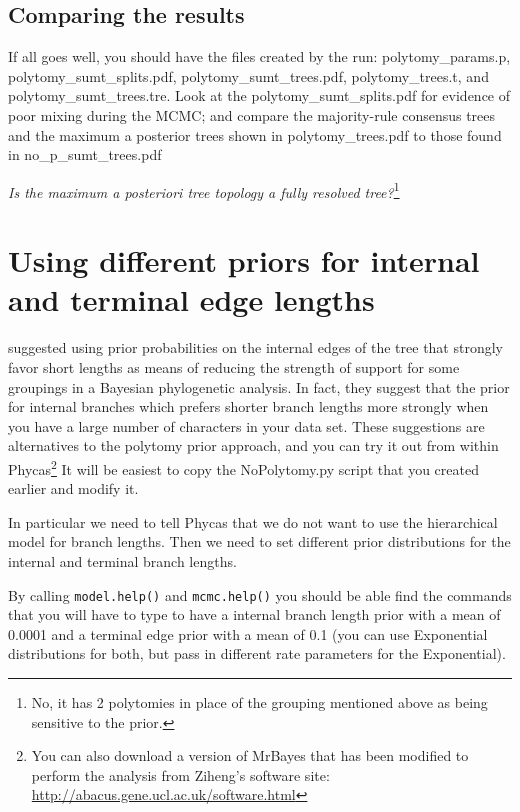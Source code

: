 \documentclass{article}
\newcommand{\cmd}[1]{\texttt{#1}\xspace}
\newcommand{\mb}{MrBayes\xspace}
\newcommand{\phycas}{Phycas\xspace}
\newcommand{\localfile}[1]{\textsf{#1}\xspace}
\newcommand{\QandA}[2]{\textit{#1}\footnote{#2}\xspace}
\begin{document}
\subsection{Comparing the results}
If all goes well, you should have the files created by the run:
\localfile{polytomy\_params.p}, \localfile{polytomy\_sumt\_splits.pdf}, \localfile{polytomy\_sumt\_trees.pdf}, \localfile{polytomy\_trees.t}, and \localfile{polytomy\_sumt\_trees.tre}.
Look at the \localfile{polytomy\_sumt\_splits.pdf}  for evidence of poor mixing  during the MCMC; 
and compare the majority-rule consensus trees and the maximum a posterior trees shown in  \localfile{polytomy\_trees.pdf} to those found in \localfile{no\_p\_sumt\_trees.pdf}

\QandA{Is the maximum a posteriori tree topology a fully resolved tree?}{No, it has 2 polytomies in place of the grouping mentioned above as being sensitive to the prior.}
\section{Using different priors for internal and terminal edge lengths}
\citet{YangR2005} \citep[and][]{Yang2007} suggested using prior probabilities on the internal edges of the tree that strongly favor short lengths as means of reducing the strength
of support for some groupings in a Bayesian phylogenetic analysis.
In fact, they suggest that the prior for internal branches which prefers shorter branch lengths more
strongly when you have a large number of characters in your data set.
These suggestions are alternatives to the polytomy prior approach, and you can try it out from within 
\phycas\footnote{You can also download a version of \mb that has been modified to perform the analysis from Ziheng's software site: \url{http://abacus.gene.ucl.ac.uk/software.html}}
It will be easiest to copy the \localfile{NoPolytomy.py} script that you created earlier 
and modify it.

In particular we need to tell \phycas that we do not want to use the hierarchical model for
branch lengths.
Then we need to set different prior distributions for the internal and terminal branch lengths.

By calling \cmd{model.help()} and \cmd{mcmc.help()} you should be able find the commands that you will have to type to have a internal branch length prior with a mean of 0.0001 and a terminal edge prior with a mean of 0.1 (you can use Exponential distributions for both, but pass in different rate parameters for the Exponential).
\end{document}
